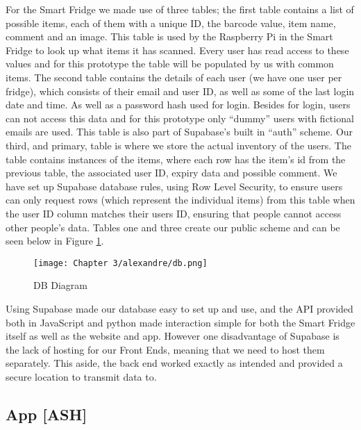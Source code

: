 For the Smart Fridge we made use of three tables; the first table contains a list of possible items, each of them with a unique ID, the barcode value, item name, comment and an image.
This table is used by the Raspberry Pi in the Smart Fridge to look up what items it has scanned.
Every user has read access to these values and for this prototype the table will be populated by us with common items.
The second table contains the details of each user (we have one user per fridge), which consists of their email and user ID, as well as some of the last login date and time.
As well as a password hash used for login.
Besides for login, users can not access this data and for this prototype only “dummy” users with fictional emails are used.
This table is also part of Supabase's built in “auth” scheme.
Our third, and primary, table is where we store the actual inventory of the users.
The table contains instances of the items, where each row has the item's id from the previous table, the associated user ID, expiry data and possible comment.
We have set up Supabase database rules, using Row Level Security, to ensure users can only request rows (which represent the individual items) from this table when the user ID column matches their users ID, ensuring that people cannot access other people's data.
Tables one and three create our public scheme and can be seen below in Figure \ref{fig:DB_Diagram}.

\begin{figure}[H]        
    \centering
    \texttt{[image: Chapter 3/alexandre/db.png]}
    \caption{DB Diagram}
    \label{fig:DB_Diagram}
\end{figure} 

Using Supabase made our database easy to set up and use, and the API provided both in JavaScript and python made interaction simple for both the Smart Fridge itself as well as the website and app.
However one disadvantage of Supabase is the lack of hosting for our Front Ends, meaning that we need to host them separately.
This aside, the back end worked exactly as intended and provided a secure location to transmit data to.

\subsection{App [ASH]}

